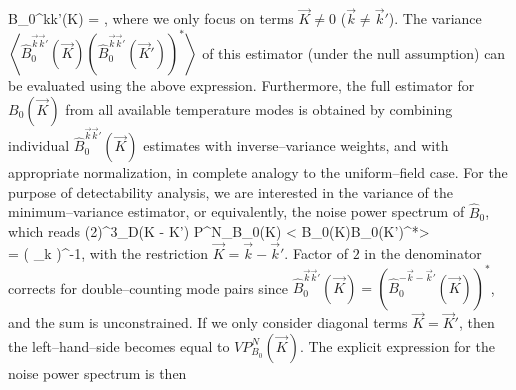 \beq
\widehat B_0^{\vec k\vec k'}(\vec K) = ,
\label{eq:Bkkp_estimator}
\eeq
where we only focus on terms $\vec K\ne0$ ($\vec k \ne\vec k'$).
The variance $\left< \widehat B_0^{\vec k\vec k'}(\vec K)\left(\widehat B_0^{\vec k\vec k'}(\vec K')\right)^*\right>$ of this estimator (under the null assumption) can be evaluated using the above expression.
Furthermore, the full estimator for $B_0(\vec K)$ from all available temperature modes is obtained by combining individual $\widehat B_0^{\vec k\vec k'}(\vec K)$ estimates with inverse--variance weights, and with appropriate normalization, in complete analogy to the uniform--field case. For the purpose of detectability analysis, we are interested in the variance of the minimum--variance estimator, or equivalently, the noise power spectrum of $\widehat B_0$, which reads
\beq
\bga
(2\pi)^3\delta_D(\vec K - \vec K') P^N_{B_0}(\vec K) \equiv \left< \widehat B_0(\vec K)\widehat B_0(\vec K')^*\right>\\
= \left( \sum_{\vec k}  \right)^{-1},
\ega
\label{eq:NK1}
\eeq
with the restriction $\vec K=\vec k-\vec k'$. Factor of $2$ in the denominator corrects for double--counting mode pairs since $\widehat B_0^{\vec k\vec k'}(\vec K)=\left(\widehat B_0^{-\vec k-\vec k'}(\vec K)\right)^*$, and the sum is unconstrained. If we only consider diagonal terms $\vec K=\vec K'$, then the left--hand--side becomes equal to $V P^N_{B_0}(\vec K)$. The explicit expression for the noise power spectrum is then
